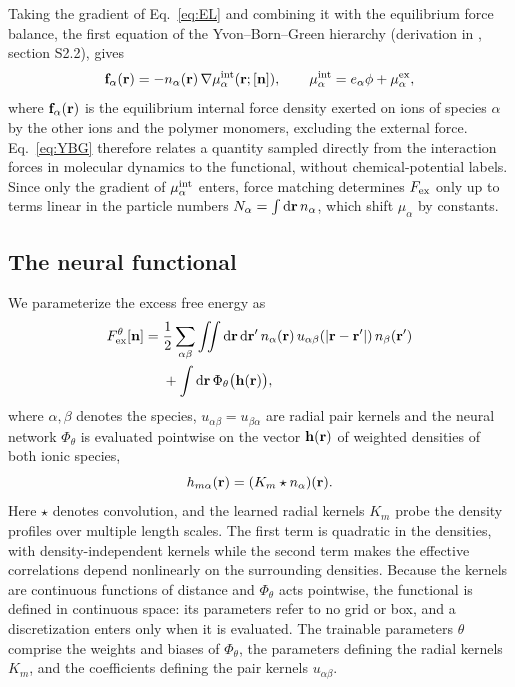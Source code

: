 Taking the gradient of Eq.~\ref{eq:EL} and combining it with the equilibrium force balance, the first equation of the Yvon--Born--Green hierarchy (derivation in \siref, section S2.2), gives
\begin{equation}
\mathbf f_\alpha(\mathbf r)=-n_\alpha(\mathbf r)\,\nabla\mu^{\rm int}_\alpha(\mathbf r;[\mathbf n]),
\qquad
\mu^{\rm int}_\alpha=e_\alpha\phi+\mu^{\rm ex}_\alpha,
\label{eq:YBG}
\end{equation}
where $\mathbf f_\alpha(\mathbf r)$ is the equilibrium internal force density exerted on ions of species $\alpha$ by the other ions and the polymer monomers, excluding the external force. Eq.~\ref{eq:YBG} therefore relates a quantity sampled directly from the interaction forces in molecular dynamics to the functional, without chemical-potential labels. Since only the gradient of $\mu^{\rm int}_\alpha$ enters, force matching determines $F_{\rm ex}$ only up to terms linear in the particle numbers $N_\alpha=\int\mathrm d\mathbf r\,n_\alpha$, which shift $\mu_\alpha$ by constants.

 


\subsection*{The neural functional}
We parameterize the excess free energy as
\begin{align}
F^\theta_{\rm ex}[\mathbf n]={}&
\frac12\sum_{\alpha\beta}\iint \mathrm d\mathbf r\,\mathrm d\mathbf r'\,
n_\alpha(\mathbf r)\,u_{\alpha\beta}(|\mathbf r-\mathbf r'|)\,n_\beta(\mathbf r')
\nonumber\\
&+\int \mathrm d\mathbf r\,\Phi_\theta\big(\mathbf h(\mathbf r)\big),
\label{eq:Fex}
\end{align}
where $\alpha,\beta$ denotes the species, $u_{\alpha\beta}=u_{\beta\alpha}$ are radial pair kernels and the neural network $\Phi_\theta$ is evaluated pointwise on the vector $\mathbf h(\mathbf r)$ of weighted densities of both ionic species,
\[
h_{m\alpha}(\mathbf r)=(K_m\star n_\alpha)(\mathbf r).
\]
Here $\star$ denotes convolution, and the learned radial kernels $K_m$ probe the density profiles over multiple length scales. The first term is quadratic in the densities, with density-independent kernels while the second term makes the effective correlations depend nonlinearly on the surrounding densities. Because the kernels are continuous functions of distance and $\Phi_\theta$ acts pointwise, the functional is defined in continuous space: its parameters refer to no grid or box, and a discretization enters only when it is evaluated. The trainable parameters $\theta$ comprise the weights and biases of $\Phi_\theta$, the parameters defining the radial kernels $K_m$, and the coefficients defining the pair kernels $u_{\alpha\beta}$.
 

